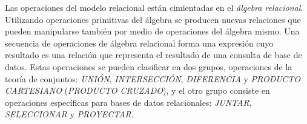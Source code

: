 Las operaciones del modelo relacional están cimientadas en el \emph{álgebra relacional}.
Utilizando operaciones primitivas del álgebra se producen nuevas relaciones que pueden manipularse también por medio de operaciones del álgebra mismo. Una secuencia de operaciones de álgebra relacional forma una expresión cuyo resultado es una relación que representa el resultado de una consulta de base de datos. Estas operaciones se pueden clasificar en dos grupos, operaciones de la teoría de conjuntos: \emph{UNIÓN}, \emph{INTERSECCIÓN}, \emph{DIFERENCIA} y \emph{PRODUCTO CARTESIANO} (\emph{PRODUCTO CRUZADO}), y el otro grupo consiste en operaciones específicas para bases de datos relacionales: \emph{JUNTAR}, \emph{SELECCIONAR} y \emph{PROYECTAR}.


